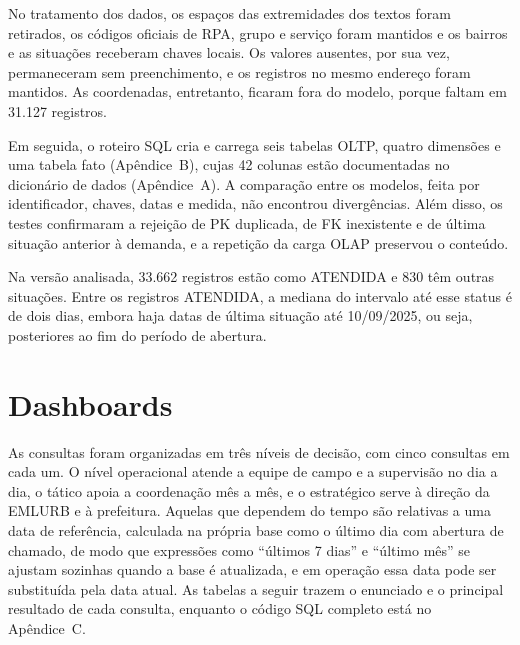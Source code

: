 \documentclass[12pt,a4paper]{article}
\begin{document}
No tratamento dos dados, os espaços das extremidades dos textos foram retirados, os códigos oficiais de RPA, grupo e serviço foram mantidos e os bairros e as situações receberam chaves locais. Os valores ausentes, por sua vez, permaneceram sem preenchimento, e os registros no mesmo endereço foram mantidos. As coordenadas, entretanto, ficaram fora do modelo, porque faltam em 31.127 registros.

Em seguida, o roteiro SQL cria e carrega seis tabelas OLTP, quatro dimensões e uma tabela fato (Apêndice~B), cujas 42 colunas estão documentadas no dicionário de dados (Apêndice~A). A comparação entre os modelos, feita por identificador, chaves, datas e medida, não encontrou divergências. Além disso, os testes confirmaram a rejeição de PK duplicada, de FK inexistente e de última situação anterior à demanda, e a repetição da carga OLAP preservou o conteúdo.

Na versão analisada, 33.662 registros estão como ATENDIDA e 830 têm outras situações. Entre os registros ATENDIDA, a mediana do intervalo até esse status é de dois dias, embora haja datas de última situação até 10/09/2025, ou seja, posteriores ao fim do período de abertura.

\section{Dashboards}

As consultas foram organizadas em três níveis de decisão, com cinco consultas em cada um. O nível operacional atende a equipe de campo e a supervisão no dia a dia, o tático apoia a coordenação mês a mês, e o estratégico serve à direção da EMLURB e à prefeitura. Aquelas que dependem do tempo são relativas a uma data de referência, calculada na própria base como o último dia com abertura de chamado, de modo que expressões como ``últimos 7 dias'' e ``último mês'' se ajustam sozinhas quando a base é atualizada, e em operação essa data pode ser substituída pela data atual. As tabelas a seguir trazem o enunciado e o principal resultado de cada consulta, enquanto o código SQL completo está no Apêndice~C.
\end{document}
